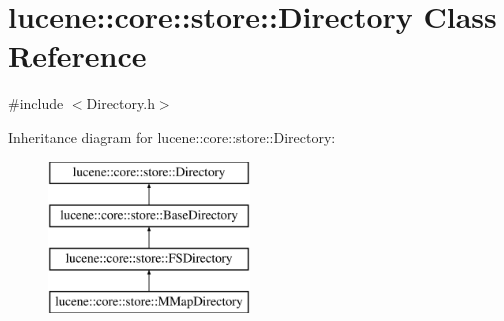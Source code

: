 \hypertarget{classlucene_1_1core_1_1store_1_1Directory}{}\section{lucene\+:\+:core\+:\+:store\+:\+:Directory Class Reference}
\label{classlucene_1_1core_1_1store_1_1Directory}


{\ttfamily \#include $<$Directory.\+h$>$}

Inheritance diagram for lucene\+:\+:core\+:\+:store\+:\+:Directory\+:\begin{figure}[H]
\begin{center}
\leavevmode
\includegraphics[height=4.000000cm]{classlucene_1_1core_1_1store_1_1Directory}
\end{center}
\end{figure}
